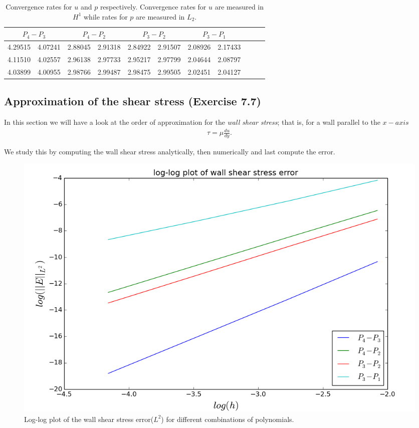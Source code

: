 \documentclass[11pt,a4paper,english]{article}
\numberwithin{equation}{section}
\begin{document}
\begin{table}[H]
\centering
\caption{Convergence rates for $u$ and $p$ respectively. Convergence rates for $u$ are measured in $H^1$ while rates for $p$ are measured in $L_2$.}
\vspace{3mm}
\begin{tabular}{|l|l|l|l|l|l|l|l|l|l|l|}
\hline
 \multicolumn{2}{|c|}{ $P_4-P_3$} &  \multicolumn{2}{|c|}{ $P_4-P_2$} &  \multicolumn{2}{|c|}{ $P_3-P_2$} &  \multicolumn{2}{|c|}{ $P_3-P_1$} \\
\hline
4.29515 & 4.07241 & 2.88045 & 2.91318 & 2.84922 & 2.91507 & 2.08926 & 2.17433 \\
\hline
4.11510 & 4.02557 & 2.96138 & 2.97733 & 2.95217 & 2.97799 & 2.04644 & 2.08797 \\
\hline
4.03899 & 4.00955 & 2.98766 & 2.99487 & 2.98475 & 2.99505 & 2.02451 & 2.04127 \\
\hline
\end{tabular}
\label{tab:vel}
\end{table}


\newpage 

\subsection{Approximation of the shear stress (Exercise 7.7)}

In this section we will have a look at the order of approximation for the \emph{wall shear stress}; that is, for a wall parallel to the $x-axis$ 
\begin{align*}
\tau = \mu \frac{du}{dy}.
\end{align*}

We study this by computing the wall shear stress analytically, then numerically and last compute the error. 

\begin{figure}[h!] 
\begin{center}
  \includegraphics[scale=0.3]{shear_loglog.png}
  \end{center}
  \caption{Log-log plot of the wall shear stress error($L^2$) for different combinations of polynomials.}
   \label{fig:shearstress}
\end{figure}
\end{document}
